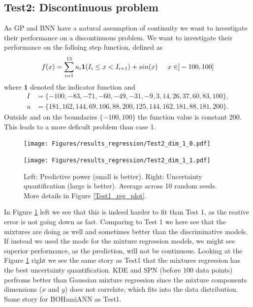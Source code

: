 \subsection*{Test2: Discontinuous problem}
As GP and BNN have a natural assumption of continuity we want to investigate their performance
on a discontinuous problem. We want to investigate their performance on the folloing step function, 
defined as 
$$f(x) = \sum_{i=1}^{13} u_i \bm{1}(I_{i}\leq x< I_{i+1}) + sin(x) \hspace{0.5cm} x \in ]-100,100]$$
where $\bm{1}$ denoted the indicator function and
\begin{align*}
  I &= \{-100,  -83,  -71,  -60,  -49,  -31,   -9,    3,   14,26,   37,   60,   83,  100\},\\
  u &= \{181, 162, 144,  69, 106,  88, 200, 125, 144, 162, 181,88, 181, 200\}.
\end{align*}
Outside and on the boundaries $\{-100,100\}$ the function value is constant 200. This leads
to a more deficult problem than case 1. 
\begin{figure}[bth]
  \centering
  \begin{minipage}[b]{0.49\textwidth}
   \texttt{[image: Figures/results\_regression/Test2\_dim\_1\_0.pdf]}
  \end{minipage}
  \hfill
  \begin{minipage}[b]{0.49\textwidth}
    \texttt{[image: Figures/results\_regression/Test2\_dim\_1\_1.pdf]}
   \end{minipage}
  \caption{Left: Predictive power (small is better). Right: Uncertainty quantification (large is
  better). Average across 10 random seeds. More details in Figure \ref{Test1_reg_plot}.}
  \label{Test2_reg_plot}
\end{figure}


In Figure \ref{Test2_reg_plot} left we see that this is indeed harder to fit than Test 1, as
the reative error is not going down as fast. Comparing to Test 1 we here see that the mixtures are
doing as well and sometimes better than the discriminative models. If instead we used the mode for
the mixture regression models, we might see superior performance, as the prediction, will not be
continuous. Looking at the Figure \ref{Test2_reg_plot} right we see the same story as Test1 that the
mixtures regression has the best uncertainty quantification. KDE and SPN (before 100 data points) perfroms better than
Gaussian mixture regression since the mixture components dimensions ($x$ and $y$) does not correlate,
which fits into the data distribution. Same story for BOHamiANN as Test1. 

